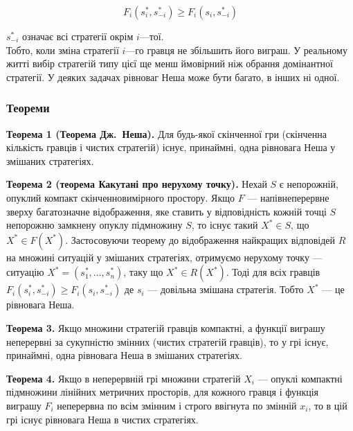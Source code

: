 \documentclass[a4paper]{article}
\begin{document}
$$F_{i}(s_{i}^*,s_{-i}^*) \geq F_{i}(s_{i},s_{-i}^*)$$

$s_{-i}^*$ означає всі стратегії окрім $i$—тої.\\
Тобто, коли зміна стратегії $i$—го гравця не збільшить його виграш. У реальному житті вибір стратегій типу цієї ще менш ймовірний ніж обрання домінантної стратегії.
У деяких задачах рівноваг Неша може бути багато, в інших ні одної.

\subsubsection*{Теореми}
\textbf{Теорема 1 (Теорема Дж.~Неша).} Для будь-якої скінченної гри (скінченна кількість гравців і чистих стратегій) існує, принаймні, одна рівновага Неша у змішаних стратегіях.

\textbf{Теорема 2 (теорема Какутані про нерухому точку).}\label{Kakutani} Нехай $S$ є непорожній, опуклий компакт скінченновимірного простору. Якщо $F$ — напівнеперервне зверху багатозначне відображення, яке ставить у відповідність кожній точці $S$ непорожню замкнену опуклу підмножину $S$, то існує такий $X^* \in S$, що $X^*\in F(X^*)$. Застосовуючи теорему до відображення найкращих відповідей $R$ на множині ситуацій у змішаних стратегіях, отримуємо нерухому точку — ситуацію $X^*=(s_1^*,\ldots,s_n^*)$, таку що $X^* \in R(X^*)$.
Тоді для всіх гравців $F_ {i} (s_ {i} ^ *, s _ {- i} ^ *) \geq F_ {i} (s_ {i}, s _ {- i} ^ *)$ де $s_i$ — довільна змішана стратегія. Тобто $X^*$ — це рівновага Неша.

\textbf{Теорема 3.} Якщо множини стратегій гравців компактні, а функції виграшу неперервні за сукупністю змінних (чистих стратегій гравців), то у грі існує, принаймні, одна рівновага Неша в змішаних стратегіях.

\textbf {Теорема 4.} Якщо в неперервній грі множини стратегій $X_i$ — опуклі компактні підмножини лінійних метричних просторів, для кожного гравця і функція виграшу $F_i$ неперервна по всім змінним і строго ввігнута по змінній $x_i$, то в цій грі існує рівновага Неша в чистих стратегіях.

\end{document}
